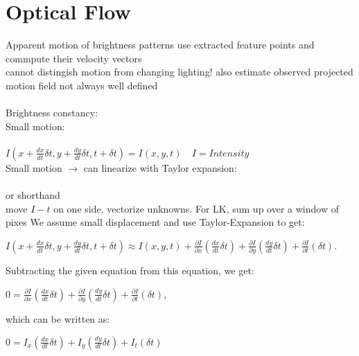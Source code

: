 \section{Optical Flow}
Apparent motion of brightness patterns use extracted feature points and commpute their velocity vectors \\
 cannot distingish motion from changing lighting! also estimate observed projected motion field  not always well defined \\
 \\
Brightness constancy: \\
Small motion: \\
\\
$I(x + \frac{dx}{dt}\delta t, y + \frac{dy}{dt} \delta t, t + \delta t) = I(x, y, t)
 \quad I = Intensity$\\
Small motion $\rightarrow$ can linearize with Taylor expansion:\\
 \\
 or shorthand \\
move $I-t$ on one side, vectorize unknowns. For LK, sum up over a window of pixes
\BoxStart
{}
We assume small displacement and use Taylor-Expansion to get:

$ I(x + \frac{dx}{dt}\delta t, y + \frac{dy}{dt}\delta t, t + \delta t) \approx I(x,y,t) + \frac{\partial I}{\partial x}(\frac{dx}{dt}\delta t) + \frac{\partial I}{\partial y}(\frac{dy}{dt}\delta t) + \frac{\partial I}{\partial t}(\delta t) $.

Subtracting the given equation from this equation, we get:

$0 = \frac{\partial I}{\partial x}(\frac{dx}{dt}\delta t) + \frac{\partial I}{\partial y}(\frac{dy}{dt}\delta t) + \frac{\partial I}{\partial t}(\delta t)$,

which can be written as:

$0 = I_x(\frac{dx}{dt}\delta t) + I_y(\frac{dy}{dt}\delta t) + I_t(\delta t)$


